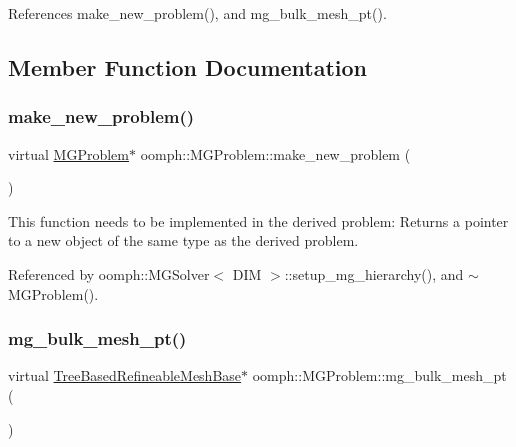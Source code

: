 References make\+\_\+new\+\_\+problem(), and mg\+\_\+bulk\+\_\+mesh\+\_\+pt().



\subsection{Member Function Documentation}
\mbox{\label{classoomph_1_1MGProblem_a8698cbc94e6cb46df5c2c189fab81196}} 
\subsubsection{\texorpdfstring{make\+\_\+new\+\_\+problem()}{make\_new\_problem()}}
{\footnotesize\ttfamily virtual \hyperlink{classoomph_1_1MGProblem}{M\+G\+Problem}$\ast$ oomph\+::\+M\+G\+Problem\+::make\+\_\+new\+\_\+problem (\begin{DoxyParamCaption}{ }\end{DoxyParamCaption})\hspace{0.3cm}{\ttfamily [pure virtual]}}



This function needs to be implemented in the derived problem\+: Returns a pointer to a new object of the same type as the derived problem. 



Referenced by oomph\+::\+M\+G\+Solver$<$ D\+I\+M $>$\+::setup\+\_\+mg\+\_\+hierarchy(), and $\sim$\+M\+G\+Problem().

\mbox{\label{classoomph_1_1MGProblem_a491bcf30805006f4b976de8ebaf5afd3}} 
\subsubsection{\texorpdfstring{mg\+\_\+bulk\+\_\+mesh\+\_\+pt()}{mg\_bulk\_mesh\_pt()}}
{\footnotesize\ttfamily virtual \hyperlink{classoomph_1_1TreeBasedRefineableMeshBase}{Tree\+Based\+Refineable\+Mesh\+Base}$\ast$ oomph\+::\+M\+G\+Problem\+::mg\+\_\+bulk\+\_\+mesh\+\_\+pt (\begin{DoxyParamCaption}{ }\end{DoxyParamCaption})\hspace{0.3cm}{\ttfamily [pure virtual]}}



